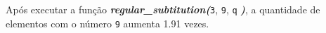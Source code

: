\documentclass[12pt,varwidth=16cm,border=1pt]{standalone}
\begin{document}
Após executar a função \textbf{\textit{regular\_subtitution(}}\verb+3+, \verb+9+, \verb+q+ \textbf{\textit{)}}, a quantidade de elementos com o número \verb+9+ aumenta 1.91 vezes.

\questiomfalse
\end{document}

